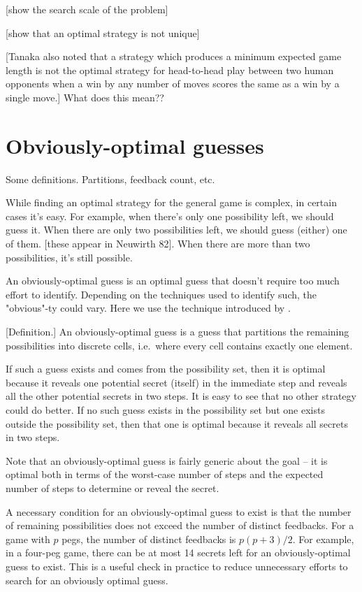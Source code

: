 [show the search scale of the problem]

[show that an optimal strategy is not unique]

[Tanaka also noted that a strategy which produces a minimum expected
game length is not the optimal strategy for head-to-head play between two human
opponents when a win by any number of moves scores the same as a win by a
single move.] What does this mean??


\section{Obviously-optimal guesses}

Some definitions. Partitions, feedback count, etc.



While finding an optimal strategy for the general game is complex, in certain cases it's easy. For example, when there's only one possibility left, we should guess it. When there are only two possibilities left, we should guess (either) one of them. [these appear in Neuwirth 82]. When there are more than two possibilities, it's still possible.

An obviously-optimal guess is an optimal guess that doesn't require too much effort to identify. Depending on the techniques used to identify such, the "obvious"-ty could vary. Here we use the technique introduced by \cite{koyama93}. 

[Definition.] An obviously-optimal guess is a guess that partitions the remaining possibilities into discrete cells, i.e.\ where every cell contains exactly one element. 

If such a guess exists and comes from the possibility set, then it is optimal because it reveals one potential secret (itself) in the immediate step and reveals all the other potential secrets in two steps. It is easy to see that no other strategy could do better. If no such guess exists in the possibility set but one exists outside the possibility set, then that one is optimal because it reveals all secrets in two steps. 

Note that an obviously-optimal guess is fairly generic about the goal -- it is optimal both in terms of the worst-case number of steps and the expected number of steps to determine or reveal the secret.

A necessary condition for an obviously-optimal guess to exist is that the number of remaining possibilities does not exceed the number of distinct feedbacks. For a game with $p$ pegs, the number of distinct feedbacks is $p(p+3)/2$. For example, in a four-peg game, there can be at most 14 secrets left for an obviously-optimal guess to exist. This is a useful check in practice to reduce unnecessary efforts to search for an obviously optimal guess.

